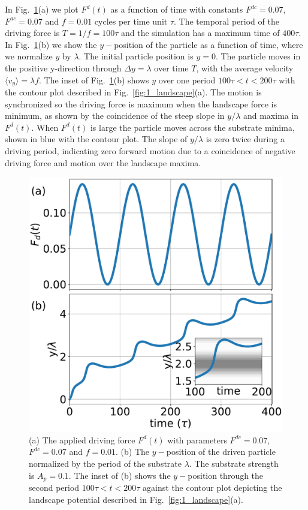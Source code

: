 \documentclass[twocolumn,showpacs,preprintnumbers,amsmath,amssymb,aps,prb]{revtex4}
\begin{document}
In Fig.~\ref{fig:2_Fd_vy_time}(a)
we plot $F^d(t)$ 
as a function of time with
constants $F^{dc}=0.07$, 
$F^{ac}=0.07$ and $f=0.01$ cycles per time unit $\tau$.
The temporal period of the driving force is
$T = 1/f = 100 \tau$ and 
the simulation has a maximum
time of $400 \tau$.
In Fig.~\ref{fig:2_Fd_vy_time}(b) 
we show the $y-$position of the particle
as a function of time,
where we 
normalize $y$ by $\lambda$.
The initial particle position is $y = 0 $. 
The particle moves
in the positive y-direction
through $\Delta y = \lambda$ over time $T$,
with 
the average velocity 
$\langle {v}_y \rangle = \lambda f$. 
The inset of Fig.~\ref{fig:2_Fd_vy_time}(b)
shows $y$ 
over one period $100\tau < t < 200 \tau$
with 
the contour plot described
in Fig.~\ref{fig:1_landscape}(a).
The motion is synchronized so the 
driving force is maximum when the landscape 
force is minimum,
as shown by the coincidence of the
steep slope in 
$y/\lambda$ 
and maxima in $F^d(t)$.
When $F^d(t)$ is large 
the particle moves across the substrate minima,
shown in blue with the contour plot.
The slope of $y/\lambda$ is zero twice
during a driving period,
indicating zero
forward motion 
due to a coincidence of negative
driving force and motion over the landscape maxima.
\begin{figure} %
\centering
\includegraphics[width=\columnwidth]{fig2_Fd_vy_time.pdf}
\caption{(a) The applied driving force $F^d(t)$ 
  with parameters $F^{dc} = 0.07$, $F^{dc} = 0.07$ and $f=0.01$.
  (b) 
  The $y-$position of the driven particle
  normalized by the period of the substrate $\lambda$.
  The substrate strength is $A_p=0.1$.
  The inset of (b) shows
  the $y-$position
  through the second period $100\tau<t<200\tau$
  against the contour plot depicting
  the landscape potential described in Fig.~\ref{fig:1_landscape}(a).
  }
\label{fig:2_Fd_vy_time}
\end{figure}
\end{document}
